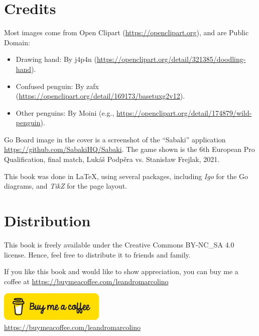 \documentclass[a4paper,12pt]{extarticle}
\begin{document}
\section*{Credits}
Most images come from Open Clipart (\url{https://openclipart.org}), and are Public Domain:

\vspace{0.25cm}

\noindent\hspace{-0.5cm}\begin{minipage}{10cm}
\begin{itemize}
\item Drawing hand: By j4p4n (\url{https://openclipart.org/detail/321385/doodling-hand}).
\item Confused penguin: By zafx (\url{https://openclipart.org/detail/169173/basetuxg2v12}).
\item Other penguins: By Moini (e.g., \url{https://openclipart.org/detail/174879/wild-penguin}).
\end{itemize}
\end{minipage}

\vspace{0.25cm}

Go Board image in the cover is a screenshot of the ``Sabaki'' application \url{https://github.com/SabakiHQ/Sabaki}. The game shown is the 6th European Pro Qualification, final match, Lukáš Podpěra vs. Stanisław Frejlak, 2021.

This book was done in \LaTeX, using several packages, including \emph{Igo} for the Go diagrams, and \emph{TikZ} for the page layout.
\section*{Distribution}

This book is freely available under the Creative Commons BY-NC\_SA 4.0 license. Hence, feel free to distribute it to friends and family.

If you like this book and would like to show appreciation, you can buy me a coffee at \url{https://buymeacoffee.com/leandromarcolino}

\begin{center}
  \href{https://buymeacoffee.com/leandromarcolino}{\includegraphics[width=5.0cm]{imgs/bmc-button.png}}\\
  \url{https://buymeacoffee.com/leandromarcolino}
\end{center}
\end{document}
